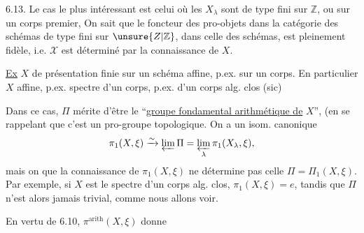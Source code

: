 6.13. Le cas le plus intéressant est celui où les $X_\lambda$ sont de type
 fini sur $\mathbb{Z}$, ou sur un corps
premier,  On sait que le foncteur
 des pro-objets dans la catégorie des schémas de type fini
sur $\unsure{Z|\mathbb Z}$, dans celle des schémas, est pleinement fidèle, i.e.
$\mathscr{X}$ est déterminé par la connaissance de $X$.

\uline{Ex} $X$ de présentation finie sur un schéma affine, p.ex. sur un
corps. En particulier $X$ affine, p.ex.  spectre d'un
corps, p.ex. d'un corps alg. clos (sic)

Dans ce cas, $\Pi$ mérite d'être  le
``\uline{groupe fondamental arithmétique de} $X$'',
(en se rappelant que c'est un  pro-groupe topologique.
On a un isom. canonique
\[
\pi_1(X,\xi)\xrightarrow{\sim}\varprojlim\Pi
=\varprojlim_\lambda\pi_1(X_\lambda,\xi),
\]
mais on   que la connaissance de $\pi_1(X,\xi)$ ne
détermine pas celle  
 $\Pi=\Pi_1(X,\xi)$.
Par exemple, si $X$ est le spectre d'un corps alg. clos,
$\pi_1(X,\xi)=e$, tandis que $\Pi$ n'est alors jamais trivial, comme
nous allons voir.

En vertu de 6.10, $\pi^{\mathrm{arith}}(X,\xi)$
donne
